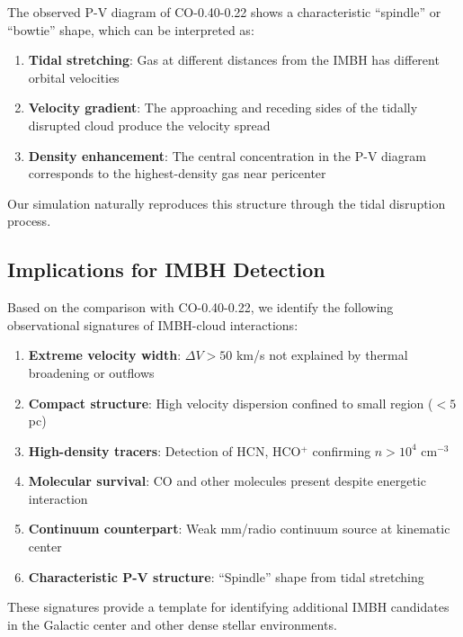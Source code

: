 \documentclass[twocolumn,amsmath,amssymb,prd,superscriptaddress,nofootinbib]{revtex4-2}
\begin{document}
The observed P-V diagram of CO-0.40-0.22 shows a characteristic ``spindle'' or ``bowtie'' shape, which can be interpreted as:

\begin{enumerate}
    \item \textbf{Tidal stretching}: Gas at different distances from the IMBH has different orbital velocities
    \item \textbf{Velocity gradient}: The approaching and receding sides of the tidally disrupted cloud produce the velocity spread
    \item \textbf{Density enhancement}: The central concentration in the P-V diagram corresponds to the highest-density gas near pericenter
\end{enumerate}

Our simulation naturally reproduces this structure through the tidal disruption process.

\subsection{Implications for IMBH Detection}

Based on the comparison with CO-0.40-0.22, we identify the following observational signatures of IMBH-cloud interactions:

\begin{enumerate}
    \item \textbf{Extreme velocity width}: $\Delta V > 50$ km/s not explained by thermal broadening or outflows

    \item \textbf{Compact structure}: High velocity dispersion confined to small region ($< 5$ pc)

    \item \textbf{High-density tracers}: Detection of HCN, HCO$^+$ confirming $n > 10^4$ cm$^{-3}$

    \item \textbf{Molecular survival}: CO and other molecules present despite energetic interaction

    \item \textbf{Continuum counterpart}: Weak mm/radio continuum source at kinematic center

    \item \textbf{Characteristic P-V structure}: ``Spindle'' shape from tidal stretching
\end{enumerate}

These signatures provide a template for identifying additional IMBH candidates in the Galactic center and other dense stellar environments.
\end{document}
